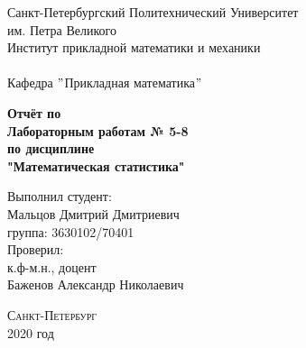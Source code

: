 \documentclass[a4]{article}
\begin{document}



\def\contentsname{\LARGE{Содержание}}
\thispagestyle{empty}

	\begin{center} 
		\vspace{2cm} 
		{\Large \sc Санкт-Петербургский Политехнический Университет}\\
		\vspace{2mm}
		{\Large\sc им. Петра Великого}\\
		\vspace{1cm}
		{\large \sc Институт прикладной математики и механики\\ 
			\vspace{0.5mm}
			\textsc{}}\\ 
		\vspace{0.5mm}
		{\large\sc Кафедра $"$Прикладная математика$"$}\\
		\vspace{15mm}
		
		
		{\sc \textbf{Отчёт по\\
				Лабораторным работам № 5-8\\
				по дисциплине\\
				"Математическая статистика"}
			\vspace{6mm}
			
		}
		\vspace*{2mm}
		
		
		\begin{flushleft}
			\vspace{4cm}
			\sc Выполнил студент:\\
			\sc Мальцов Дмитрий Дмитриевич\\
			\sc группа: 3630102/70401\\
			\vspace{1cm}
			\sc Проверил:\\
			\sc к.ф-м.н., доцент\\
			\sc Баженов Александр Николаевич
			\vspace{20mm}
		\end{flushleft}
	\end{center} 
	\begin{center}
		\vfill {\large\textsc{Санкт-Петербург}}\\ 
		2020 год
	\end{center}


\newpage
\pagestyle{plain}
\end{document}
